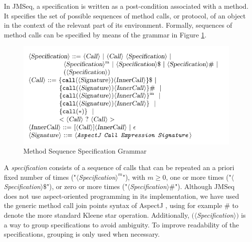 
 

In JMSeq, a specification is written as a post-condition associated with a method. It
specifies the set of possible sequences of method calls, or protocol, of an
object in the context of the relevant part of its environment. Formally,
sequences of method calls can be specified by means
of the grammar in  Figure \ref{fig:spec_grammar}.

\begin{figure}[h]
\begin{center}
\begin{framed}
\includegraphics[scale=1]{grammar}
\end{framed}
\caption{Method Sequence Specification Grammar}
\label{fig:spec_grammar}
\end{center}
\end{figure}

A \textsl{specification} consists of a sequence of calls that can be repeated an
a priori fixed number of times 
("${\langle}$\textsl{Specification}${\rangle}^m$"), with $m \geq 0$, one or
more times ("${\langle}$\textsl{Specification}${\rangle}\$ $"), or zero or more
times ("${\langle}$\textsl{Specification}${\rangle}\#$"). Although JMSeq does
not use aspect-oriented programming in its implementation, we have used the
generic method call join points syntax of AspectJ \cite{kiczales_aspectj},
using for example $\#$ to denote the more standard Kleene star operation.
Additionally, $(\langle$\textsl{Specification}$\rangle)$ is a way to group
specifications to avoid ambiguity. To improve readability of the
specifications, grouping is only used when necessary.

